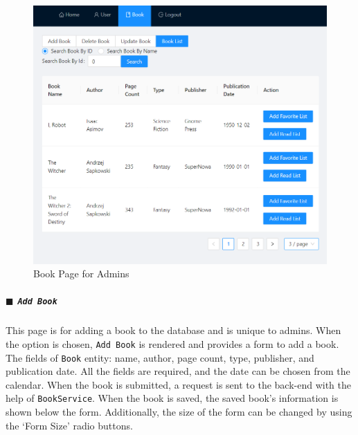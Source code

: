 \begin{minipage}{.49\textwidth}
  \begin{figure}[H]
    \centering
    \includegraphics[width=\linewidth]{img/front-end/book-admin.png}
    \caption{Book Page for Admins}
  \end{figure}
\end{minipage}
\newpage

\subparagraph{\texorpdfstring{$\blacksquare$}{-} \texttt{Add Book}}

This page is for adding a book to the database and is unique to admins. When the option is chosen, \texttt{Add Book} is rendered and provides a form to add a book. The fields of \texttt{Book} entity: name, author, page count, type, publisher, and publication date. All the fields are required, and the date can be chosen from the calendar. When the book is submitted, a request is sent to the back-end with the help of \texttt{BookService}. When the book is saved, the saved book's information is shown below the form. Additionally, the size of the form can be changed by using the `Form Size' radio buttons.

